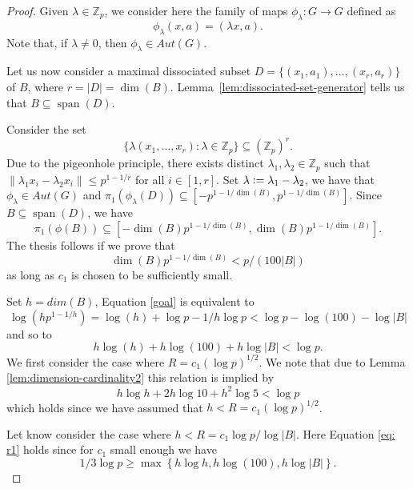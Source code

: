 \documentclass[11pt]{amsart}
\theoremstyle{definition}
\DeclareMathOperator{\Span}{span}
\begin{document}
\begin{proof}
Given $\lambda\in \mathbb{Z}_p$, we consider here the family of maps $\phi_{\lambda}: G\rightarrow G$
defined as
$$ \phi_{\lambda}(x,a)=(\lambda x,a).$$
Note that, if $\lambda\not=0$, then $\phi_{\lambda}\in Aut(G)$.

Let us now consider a maximal dissociated subset $D=\{(x_1,a_1),\dots,(x_r,a_r)\}$ of $B$, where $r=|D|= \dim(B)$. Lemma~\ref{lem:dissociated-set-generator} tells us that $B\subseteq \Span(D)$.

Consider the set
$$\{\lambda(x_1,\dots,x_r): \lambda \in \mathbb{Z}_p\} \subseteq (\mathbb{Z}_p)^{r}.$$
Due to the pigeonhole principle, there exists distinct $\lambda_1, \lambda_2 \in \mathbb{Z}_p$ such that $\|\lambda_1 x_i -\lambda_2 x_i\| \leq p^{1-1/r}$ for all $i\in [1,r]$.  Set $\lambda\vcentcolon=\lambda_1-\lambda_2$, we have that $\phi_\lambda\in Aut(G)$ and $\pi_1(\phi_\lambda(D))\subseteq  [-p^{1-1/\dim(B)},p^{1-1/\dim(B)}]$.
Since $B\subseteq \Span(D)$, we have
$$\pi_1(\phi(B)) \subseteq [-\dim(B)p^{1-1/\dim(B)},\dim(B)p^{1-1/\dim(B)}].$$
The thesis follows if we prove that 
\begin{equation}\label{goal}
\dim(B)p^{1-1/\dim(B)}<p/(100|B|)
\end{equation} 
as long as $c_1$ is chosen to be sufficiently small.

Set $h=dim(B)$, Equation \eqref{goal} is equivalent to
$$\log({h p^{1-1/h}})=\log(h)+\log{p}-1/h\log{p}<\log{p}-\log(100)-\log{|B|}$$
and so to
\begin{equation}\label{eq: r1}
    h \log(h) + h \log(100) + h\log|B| < \log p.
\end{equation}
We first consider the case where $R = c_1 (\log p)^{1/2}$. We note that due to Lemma \ref{lem:dimension-cardinality2} this relation is implied by
$$h\log{h}+2h\log{10}+h^2\log{5}<\log{p}
$$
which holds since we have assumed that $h < R = c_1 (\log p)^{1/2}$.

Let know consider the case where $h < R = c_1 \log p / \log |B|$. Here Equation \eqref{eq: r1} holds since for $c_1$ small enough we have
$$1/3 \log p \geq \max \left\{ h \log h, h \log (100), h \log |B| \right\}.$$
\end{proof}
\end{document}
